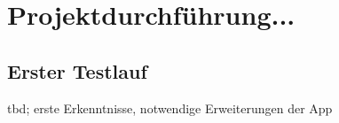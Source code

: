 \section{Projektdurchführung...}

\subsection{Erster Testlauf}
tbd; erste Erkenntnisse, notwendige Erweiterungen der App

